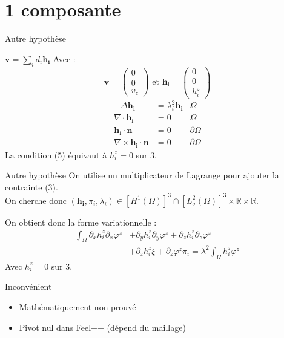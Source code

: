 \documentclass{beamer}
\newcommand{\laplace}{{\Delta}}
\newcommand{\rot}{{\nabla\times}}
\renewcommand{\div}{{\nabla\cdot}}
\begin{document}
\section{1 composante}
\begin{frame}{Autre hypothèse}
\begin{block}{$\bm{v}=\sum_i d_i\bm{h_i}$}
Avec :
\[
\bm{v}=\begin{pmatrix}
0\\0\\v_z
\end{pmatrix}
\text{ et }\bm{h_i}=\begin{pmatrix}
0\\0\\h_i^z
\end{pmatrix}
\]
\begin{align}
-\laplace\bm{h_i}&=\lambda_i^2\bm{h_i} & \Omega\\
\div\bm{h_i}&=0 & \Omega\\
\bm{h_i}\cdot\bm{n}&=0 & \partial\Omega\\
\rot\bm{h_i}\cdot\bm{n}&=0 & \partial\Omega
\end{align}
La condition (5) équivaut à $h_i^z=0$ sur 3.
\end{block}
\end{frame}

\begin{frame}{Autre hypothèse}
On utilise un multiplicateur de Lagrange pour ajouter la contrainte (3).\\
On cherche donc $(\bm{h_i},\pi_i,\lambda_i)\in [H^1(\Omega)]^3\cap [L^2_\sigma(\Omega)]^3 \times \mathbb{R} \times \mathbb{R}$.
\begin{block}{On obtient donc la forme variationnelle :}
\begin{align*}
\int_\Omega \partial_xh_i^z\partial_x\varphi^z &+ \partial_yh_i^z\partial_y\varphi^z + \partial_zh_i^z\partial_z\varphi^z\\
&+ \partial_z h_i^z\xi + \partial_z\varphi^z\pi_i = \lambda^2\int_\Omega h_i^z\varphi^z
\end{align*}
Avec $h_i^z=0$ sur 3.
\end{block}
\begin{alertblock}{Inconvénient}
\begin{itemize}
\item Mathématiquement non prouvé
\item Pivot nul dans Feel++ (dépend du maillage)
\end{itemize}
\end{alertblock}
\end{frame}
\end{document}
